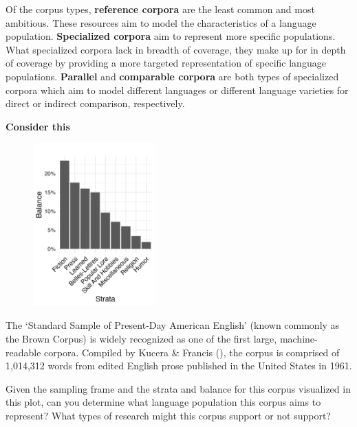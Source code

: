 \documentclass[
  letterpaper,
  krantz1]{latex/krantz-mod}
\theoremstyle{definition}
\theoremstyle{definition}
\theoremstyle{remark}
\begin{document}
Of the corpus types, \textbf{reference corpora}
are the least common and most ambitious. These resources aim to model
the characteristics of a language population.
\textbf{Specialized corpora} aim to represent
more specific populations. What specialized corpora lack in breadth of
coverage, they make up for in depth of coverage by providing a more
targeted representation of specific language populations.
\textbf{Parallel} and
\textbf{comparable corpora} are both types of
specialized corpora which aim to model different languages or different
language varieties for direct or indirect comparison, respectively.

\begin{tcolorbox}[enhanced jigsaw, leftrule=.75mm, colframe=quarto-callout-color-frame, left=2mm, colback=white, toprule=.15mm, breakable, arc=.35mm, opacityback=0, bottomrule=.15mm, rightrule=.15mm]

\textbf{ Consider this}

\begin{figure}
  \vspace{-20pt}%
  \centering
  \includegraphics[width=0.42\textwidth]{part_2/figures/fig-brown-corpus.png}
\end{figure}

The `Standard Sample of Present-Day American English' (known commonly as
the Brown Corpus) is widely recognized as one of the first large,
machine-readable corpora. Compiled by Kucera \& Francis
(), the corpus is comprised of 1,014,312
words from edited English prose published in the United States in 1961.

Given the sampling frame and the strata and balance for this corpus
visualized in this plot, can you determine what language population this
corpus aims to represent? What types of research might this corpus
support or not support?

\end{tcolorbox}
\end{document}
